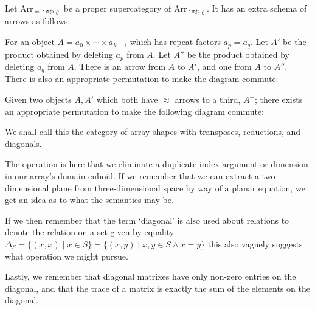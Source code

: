 \documentclass{DIKU-report-variant}
\newcommand\mrm[1]{\mathrm{#1}}
\newcommand\brm[1]{\bm{\mrm{#1}}}
\newcommand\Arr[1]{{\brm{Arr}_{\brm{#1}}}}
\newcommand\DSSFR{\div\sigma\sharp\flat\varrho}
\newcommand\ADSSFR{\approx\div\sigma\sharp\flat\varrho}
\begin{document}
\begin{definition}
  \label{def:category-of-diagonals}
  Let \(\Arr\ADSSFR\) be a proper supercategory of \(\Arr\DSSFR\).
  It has an extra schema of arrows as follows:

  For an object \(A = a_0 \times \cdots \times a_{k-1}\) which has repeat factors
  \(a_p = a_q\). Let \(A'\) be the product obtained by deleting
  \(a_p\) from \(A\). Let \(A''\) be the product obtained by deleting \(a_q\) from \(A\).
  There is an arrow from \(A\) to \(A'\), and one from \(A\) to \(A''\).
  There is also an appropriate permutation to make the diagram commute:
  \begin{center}
  \end{center}

  Given two objects \(A, A'\) which both have \(\approx\) arrows to a third, \(A^+\); there
  exists an appropriate permutation to make the following diagram commute:
        
  \begin{center}
  \end{center}

  We shall call this the category of array shapes with transposes, reductions, and
  diagonals.
\end{definition}

The operation is here that we eliminate a duplicate index argument or dimension in our array's
domain cuboid. If we remember that we can extract a two-dimensional plane from
three-dimensional space by way of a planar equation, we get an idea as to what the semantics
may be.

If we then remember that the term `diagonal' is also used about relations to denote the
relation on a set given by equality
\(\Delta_S = \{ (x, x) \mid x \in S \} = \{ (x, y) \mid x, y \in S \land x = y \}\)
this also vaguely suggests what operation we might pursue.

Lastly, we remember that diagonal matrixes have only non-zero entries on the diagonal,
and that the trace of a matrix is exactly the sum of the elements on the diagonal.
\end{document}
